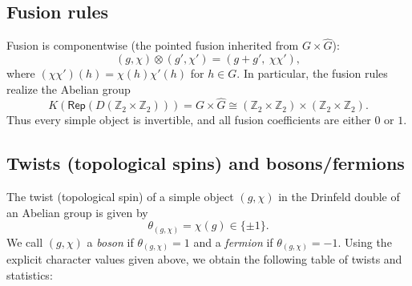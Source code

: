 \documentclass[a4paper,11pt]{article}
\theoremstyle{definition}
\theoremstyle{remark}
\theoremstyle{remark}
\newcommand\Rep {\mathsf{Rep}}
\begin{document}
\subsection*{Fusion rules}

Fusion is componentwise (the pointed fusion inherited from $G\times\widehat{G}$):
\begin{equation*}
    (g,\chi)\otimes(g',\chi') = (g+g',\ \chi\chi'),
\end{equation*}
where $(\chi\chi')(h)=\chi(h)\chi'(h)$ for $h\in G$.  
In particular, the fusion rules realize the Abelian group
\begin{equation*}
K(\Rep(D(\mathbb{Z}_2\times\mathbb{Z}_2))) 
= G \times \widehat{G}
\cong (\mathbb{Z}_2\times\mathbb{Z}_2)\times(\mathbb{Z}_2\times\mathbb{Z}_2).
\end{equation*}
Thus every simple object is invertible, and all fusion coefficients are either $0$ or $1$.



\subsection*{Twists (topological spins) and bosons/fermions}

The twist (topological spin) of a simple object $(g,\chi)$ in the Drinfeld double of an Abelian group is given by
\begin{equation*}
    \theta_{(g,\chi)} = \chi(g) \in \{\pm 1\}.
\end{equation*}
We call $(g,\chi)$ a \emph{boson} if $\theta_{(g,\chi)}=1$ and a \emph{fermion} if $\theta_{(g,\chi)}=-1$.  
Using the explicit character values given above, we obtain the following table of twists and statistics:
\end{document}
